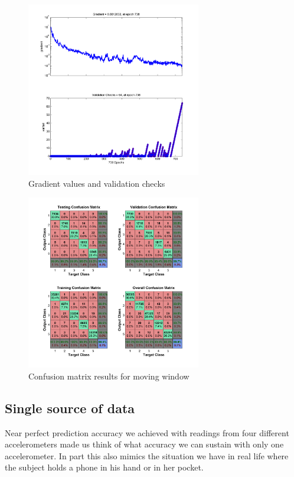 \documentclass{article}
\begin{document}
\begin{figure}
\centering
\includegraphics[width=3in]{14_train}
\caption{Gradient values and validation checks}
\label{14_train}
\end{figure}

\begin{figure}
\centering
\includegraphics[width=3in]{14_confusion}
\caption{Confusion matrix results for moving window}
\label{14_confusion}
\end{figure}


\subsection{Single source of data} 
\label{single_acc}
Near perfect prediction accuracy we achieved with readings from four different accelerometers made us think of what accuracy we can sustain with 
only one accelerometer. In part this also mimics the situation we have in real life where the subject holds a phone in his hand or in her
pocket. 


\end{document}
